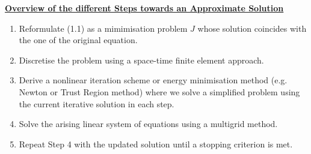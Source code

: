\documentclass[../draft_1.tex]{subfiles}
\begin{document}
\begin{framed}
	\underline{\textbf{Overview of the different Steps towards an Approximate Solution}} 
	
	\begin{enumerate}
		\item  Reformulate (1.1) as a mimimisation problem $J$ whose solution coincides with the one of the original equation. 
		\item Discretise the problem using a space-time finite element approach.
		\item Derive a nonlinear iteration scheme or energy minimisation method (e.g. Newton or Trust Region method) where we solve a simplified problem using the current iterative solution in each step.
		\item  Solve the arising linear system of equations using a multigrid method.
		\item Repeat Step 4 with the updated solution until a stopping criterion is met. 
	\end{enumerate}	
\end{framed}
\end{document}
